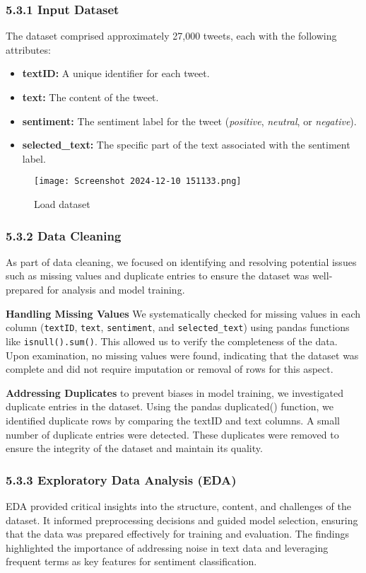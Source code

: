 \documentclass[journal]{IEEEtran}
\begin{document}
\subsubsection*{\textbf{5.3.1 Input Dataset}}
The dataset comprised approximately 27,000 tweets, each with the following attributes:
\begin{itemize}
    \item \textbf{textID:} A unique identifier for each tweet.
    \item \textbf{text:} The content of the tweet.
    \item \textbf{sentiment:} The sentiment label for the tweet (\textit{positive}, \textit{neutral}, or \textit{negative}).
    \item \textbf{selected\_text:} The specific part of the text associated with the sentiment label.
\end{itemize}
\begin{figure}[H]
\centering
\texttt{[image: Screenshot 2024-12-10 151133.png]}
\caption{Load dataset }
\end{figure}
\subsubsection*{\textbf{5.3.2 Data Cleaning}}
As part of data cleaning, we focused on identifying and resolving potential issues such as missing values and duplicate entries to ensure the dataset was well-prepared for analysis and model training.

\textbf{Handling Missing Values} We systematically checked for missing values in each column (\texttt{textID}, \texttt{text}, \texttt{sentiment}, and \texttt{selected\_text}) using pandas functions like \texttt{isnull().sum()}. This allowed us to verify the completeness of the data. Upon examination, no missing values were found, indicating that the dataset was complete and did not require imputation or removal of rows for this aspect.

\textbf{Addressing Duplicates} to prevent biases in model training, we investigated duplicate entries in the dataset. Using the pandas duplicated() function, we identified duplicate rows by comparing the textID and text columns. A small number of duplicate entries were detected. These duplicates were removed to ensure the integrity of the dataset and maintain its quality.

\subsubsection*{\textbf{5.3.3 Exploratory Data Analysis (EDA)}}
EDA provided critical insights into the structure, content, and challenges of the dataset. It informed preprocessing decisions and guided model selection, ensuring that the data was prepared effectively for training and evaluation. The findings highlighted the importance of addressing noise in text data and leveraging frequent terms as key features for sentiment classification.
\end{document}
